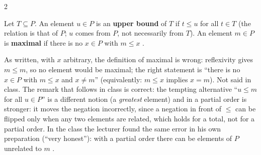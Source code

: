 \begin{paracol}{2}
\begin{definition}\label{def:rm-upper}
Let $T\subseteq P$. An element $u\in P$ is an \textbf{upper bound} of $T$ if $t\le u$ for all $t\in T$ (the relation is that of $P$; $u$ comes from $P$, not necessarily from $T$). An element $m\in P$ is \textbf{maximal} if there is no $x\in P$ with $m\le x$
      .
\end{definition}
\begin{coursenote}
As written, with $x$ arbitrary, the definition of maximal is wrong: reflexivity gives $m\le m$, so no element would be maximal; the right statement is ``there is no $x\in P$ with $m\le x$ and $x\ne m$'' (equivalently: $m\le x$ implies $x=m$). Not said in class. The remark that follows in class is correct: the tempting alternative ``$u\le m$ for all $u\in P$'' is a different notion
(a \emph{greatest} element) and in a partial order is stronger: it moves the negation incorrectly, since a negation in front of $\le$ can be flipped only when any two elements are related, which holds for a total, not for a partial order. In the class the lecturer found the same error in his own preparation
(``very honest''): with a partial order there can be elements of $P$ unrelated to $m$     .
\end{coursenote}


\end{paracol}
